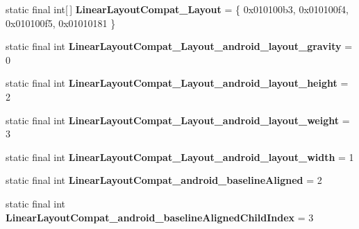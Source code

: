 \begin{DoxyCompactItemize}
\item 
\hypertarget{classandroid_1_1support_1_1design_1_1_r_1_1styleable_aa15b34677245387b51b9ce8ce236e56a}{}static final int\mbox{[}$\,$\mbox{]} {\bfseries Linear\+Layout\+Compat\+\_\+\+Layout} = \{ 0x010100b3, 0x010100f4, 0x010100f5, 0x01010181 \}\label{classandroid_1_1support_1_1design_1_1_r_1_1styleable_aa15b34677245387b51b9ce8ce236e56a}

\item 
\hypertarget{classandroid_1_1support_1_1design_1_1_r_1_1styleable_af6c8c39396ffc7f945642362c1b9f752}{}static final int {\bfseries Linear\+Layout\+Compat\+\_\+\+Layout\+\_\+android\+\_\+layout\+\_\+gravity} = 0\label{classandroid_1_1support_1_1design_1_1_r_1_1styleable_af6c8c39396ffc7f945642362c1b9f752}

\item 
\hypertarget{classandroid_1_1support_1_1design_1_1_r_1_1styleable_a89a3ec25c91803224e2e3de68bda74d3}{}static final int {\bfseries Linear\+Layout\+Compat\+\_\+\+Layout\+\_\+android\+\_\+layout\+\_\+height} = 2\label{classandroid_1_1support_1_1design_1_1_r_1_1styleable_a89a3ec25c91803224e2e3de68bda74d3}

\item 
\hypertarget{classandroid_1_1support_1_1design_1_1_r_1_1styleable_a9d088a0da6aac134d732ca1683da8969}{}static final int {\bfseries Linear\+Layout\+Compat\+\_\+\+Layout\+\_\+android\+\_\+layout\+\_\+weight} = 3\label{classandroid_1_1support_1_1design_1_1_r_1_1styleable_a9d088a0da6aac134d732ca1683da8969}

\item 
\hypertarget{classandroid_1_1support_1_1design_1_1_r_1_1styleable_a7baa6f78e9b97ea62804abb450ea5fdb}{}static final int {\bfseries Linear\+Layout\+Compat\+\_\+\+Layout\+\_\+android\+\_\+layout\+\_\+width} = 1\label{classandroid_1_1support_1_1design_1_1_r_1_1styleable_a7baa6f78e9b97ea62804abb450ea5fdb}

\item 
\hypertarget{classandroid_1_1support_1_1design_1_1_r_1_1styleable_a22effd7a7321cd1d30a0fdf070aa0fd9}{}static final int {\bfseries Linear\+Layout\+Compat\+\_\+android\+\_\+baseline\+Aligned} = 2\label{classandroid_1_1support_1_1design_1_1_r_1_1styleable_a22effd7a7321cd1d30a0fdf070aa0fd9}

\item 
\hypertarget{classandroid_1_1support_1_1design_1_1_r_1_1styleable_a3709324492722be4a6bb1ec413a0b65c}{}static final int {\bfseries Linear\+Layout\+Compat\+\_\+android\+\_\+baseline\+Aligned\+Child\+Index} = 3\label{classandroid_1_1support_1_1design_1_1_r_1_1styleable_a3709324492722be4a6bb1ec413a0b65c}


\end{DoxyCompactItemize}
